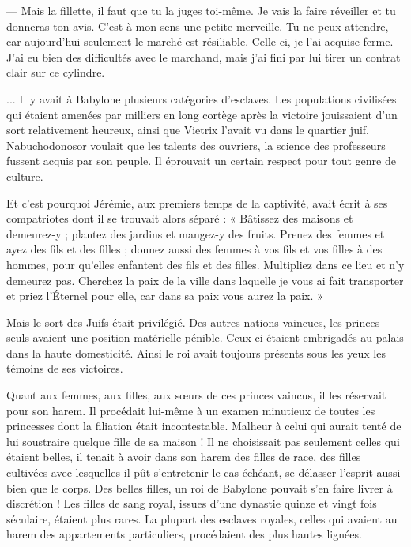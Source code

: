 \documentclass[a4paper, 11pt, oneside, polutonikogreek, french]{article}
\begin{document}
--- Mais la fillette, il faut que tu la juges toi-même. Je vais la faire réveiller et tu donneras ton avis. C'est à mon sens une petite merveille. Tu ne peux attendre, car aujourd'hui seulement le marché est résiliable. Celle-ci, je l'ai acquise ferme. J'ai eu bien des difficultés avec le marchand, mais j'ai fini par lui tirer un contrat clair sur ce cylindre.

\bigskip
\centerline{\EightStarTaper}
\centerline{\EightStarTaper\EightStarTaper}
\bigskip

... Il y avait à Babylone plusieurs catégories d'esclaves. Les populations civilisées qui étaient amenées par milliers en long cortège après la victoire jouissaient d'un sort relativement heureux, ainsi que Vietrix l'avait vu dans le quartier juif. Nabuchodonosor voulait que les talents des ouvriers, la science des professeurs fussent acquis par son peuple. Il éprouvait un certain respect pour tout genre de culture.

Et c'est pourquoi Jérémie, aux premiers temps de la captivité, avait écrit à ses compatriotes dont il se trouvait alors séparé : « Bâtissez des maisons et demeurez-y ; plantez des jardins et mangez-y des fruits. Prenez des femmes et ayez des fils et des filles ; donnez aussi des femmes à vos fils et vos filles à des hommes, pour qu'elles enfantent des fils et des filles. Multipliez dans ce lieu et n'y demeurez pas. Cherchez la paix de la ville dans laquelle je vous ai fait transporter et priez l'Éternel pour elle, car dans sa paix vous aurez la paix. »

Mais le sort des Juifs était privilégié. Des autres nations vaincues, les princes seuls avaient une position matérielle pénible. Ceux-ci étaient embrigadés au palais dans la haute domesticité. Ainsi le roi avait toujours présents sous les yeux les témoins de ses victoires.

\bigskip
\centerline{\EightStarTaper}
\centerline{\EightStarTaper\EightStarTaper}
\bigskip

Quant aux femmes, aux filles, aux sœurs de ces princes vaincus, il les réservait pour son harem. Il procédait lui-même à un examen minutieux de toutes les princesses dont la filiation était incontestable. Malheur à celui qui aurait tenté de lui soustraire quelque fille de sa maison ! Il ne choisissait pas seulement celles qui étaient belles, il tenait à avoir dans son harem des filles de race, des filles cultivées avec lesquelles il pût s'entretenir le cas échéant, se délasser l'esprit aussi bien que le corps. Des belles filles, un roi de Babylone pouvait s'en faire livrer à discrétion ! Les filles de sang royal, issues d'une dynastie quinze et vingt fois séculaire, étaient plus rares. La plupart des esclaves royales, celles qui avaient au harem des appartements particuliers, procédaient des plus hautes lignées.
\end{document}
